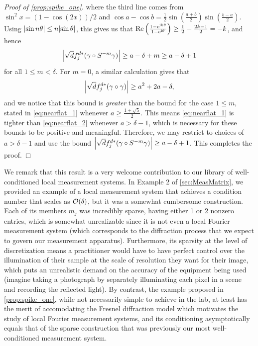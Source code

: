 \begin{proof}[Proof of \cref{prop:spike_one}]
  where the third line comes from $\sin^2 x = (1 - \cos(2x)) / 2$ and $\cos a - \cos b = \frac{1}{2} \sin\left(\frac{a + b}{2}\right) \sin\left(\frac{b - a}{2}\right)$.  Using $\abs{\sin n\theta} \le n \abs{\sin \theta}$, this gives us that $\Re\left(\frac{1 - \ee^{\ii k \theta}}{1 - \eit}\right) \ge \frac{1}{2} - \frac{2k - 1}{2} = -k$, and hence \begin{equation} \abs*{\sqrt{d} f_j^{d*}(\gamma \circ S^{-m} \gamma)} \ge a - \delta + m \ge a - \delta + 1 \label{eq:nearflat_1} \end{equation} for all $1 \le m < \delta$.  For $m = 0$, a similar calculation gives that \begin{equation} \abs*{\sqrt{d} f_j^{d*}(\gamma \circ \gamma)} \ge a^2 + 2a - \delta, \label{eq:nearflat_2}\end{equation} and we notice that this bound is \emph{greater} than the bound for the case $1 \le m$, stated in \eqref{eq:nearflat_1} whenever $a \ge \frac{1 + \sqrt{5}}{2}$.  This means \eqref{eq:nearflat_1} is tighter than \eqref{eq:nearflat_2} whenever $a > \delta - 1$, which is necessary for these bounds to be positive and meaningful.  Therefore, we may restrict to choices of $a > \delta - 1$ and use the bound $\abs*{\sqrt{d} f_j^{d*}(\gamma \circ S^{-m} \gamma)} \ge a - \delta + 1$.  This completes the proof.
\end{proof}

We remark that this result is a very welcome contribution to our library of well-conditioned local measurement systems.  In Example 2 of \cref{sec:MeasMatrix}, we provided an example of a local measurement system that achieves a condition number that scales as $\bigO(\delta)$, but it was a somewhat cumbersome construction.  Each of its members $m_j$ was incredibly sparse, having either 1 or 2 nonzero entries, which is somewhat unrealizable since it is not even a local Fourier measurement system (which corresponds to the diffraction process that we expect to govern our measurement apparatus).  Furthermore, its sparsity at the level of discretization means a practitioner would have to have perfect control over the illumination of their sample at the scale of resolution they want for their image, which puts an unrealistic demand on the accuracy of the equipment being used (imagine taking a photograph by separately illuminating each pixel in a scene and recording the reflected light).  By contrast, the example proposed in \cref{prop:spike_one}, while not necessarily simple to achieve in the lab, at least has the merit of accomodating the Fresnel diffraction model which motivates the study of local Fourier measurement systems, and its conditioning asymptotically equals that of the sparse construction that was previously our most well-conditioned measurement system.

